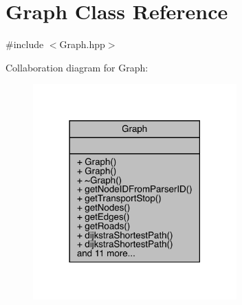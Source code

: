 \hypertarget{class_graph}{}\section{Graph Class Reference}
\label{class_graph}


{\ttfamily \#include $<$Graph.\+hpp$>$}



Collaboration diagram for Graph\+:
\nopagebreak
\begin{figure}[H]
\begin{center}
\leavevmode
\includegraphics[width=222pt]{class_graph__coll__graph}
\end{center}
\end{figure}
